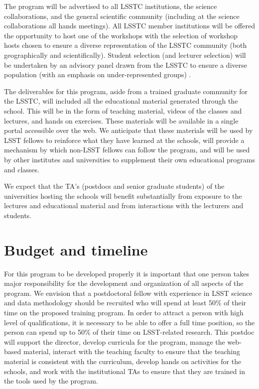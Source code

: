 \documentclass[nofootbib,floatfix,11pt]{article}
\begin{document}
The program will be advertised to all LSSTC institutions, the science collaborations, and the general scientific community (including at the science collaborations all hands meetings). All LSSTC member institutions will be offered the opportunity to host one of the workshops with the selection of workshop hosts chosen to ensure a diverse representation of the LSSTC community (both geographically and scientifically). Student selection (and lecturer selection) will be undertaken by an advisory panel drawn from the LSSTC to ensure a diverse population (with an emphasis on under-represented groups) .

The deliverables for this program, aside from a trained graduate community for the LSSTC, will included all the educational material generated through the school. This will be in the form of teaching material, videos of the classes and lectures, and hands on exercises. These materials will be available in a single portal accessible over the web. We anticipate that these materials will be used by LSST fellows to reinforce what they have learned at the schools, will provide a mechanism by which non-LSST fellows can follow the program, and will be used by other institutes and universities to supplement their own educational programs and classes. 

We expect that the TA's (postdocs and senior graduate students) of the universities hosting the schools will benefit substantially from exposure to the lectures and educational material and from interactions with the lecturers and students.

\section{Budget and timeline}

For this program to be developed properly it is important that one person takes major responsibility for the development and organization of all aspects of the program. We envision that a postdoctoral fellow with experience in LSST science and data methodology should be recruited who will spend at least 50\% of their time on the proposed training program. In order to attract a person with high level of qualifications, it is necessary to be able to offer a full time position, so the person can spend up to 50\% of their time on LSST-related research. This postdoc will support the director, develop curricula for the program, manage the web-based material, interact with the teaching faculty to ensure that the teaching material is consistent with the curriculum, develop hands on activities for the schools, and work with the institutional TAs to ensure that they are trained in the tools used by the program.
\end{document}
